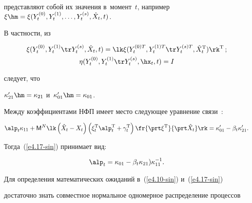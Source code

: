 представляют собой их значения в~момент~$t$, например  $\xi \hm=


\xi(Y_t^{(0)}, Y_t^{(1)}, \ldots, Y_t^{(s)}, \hat X_t,t)$.





В частности, из  


\begin{gather*}


\xi(Y_t^{(0)}, Y_t^{(1)}\tr Y_t^{(s)},\hat X_t,t)


=\lk \xi(Y_t^{(0)T}, Y_t^{(1)T}\tr Y_t^{(s)T},\hat X_t^{\mathrm{T}}) 


\rk^{\mathrm{T}}\,;\\


\eta (Y_t^{(0)}, Y_t^{(1)}\tr Y_t^{(s)},\hx_t,t) =I


\end{gather*}


следует, что


$\kappa_{21}'\hm=\kappa_{21}$ и~$\kappa_{01}'\hm=\kappa_{01}$.








Между коэффициентами НФП имеет место следующее уравнение связи~\cite{2-sin}:


 \begin{equation*}


 \alp_t \kappa_{11} + {\sf M}^N \lk \left(\hat X_t - X_t\right)


 \left(\xi_t^{\mathrm{T}} \alp_t^{\mathrm{T}} + \gamma_t^{\mathrm{T}}\right) 


 \fr{\prt \xi^{\mathrm{T}}}{\prt \hat X_t} \rk 


 = \kappa_{01}' - \beta_t \kappa_{21}'. %


 \end{equation*}


Тогда~(\ref{e4.17-sin}) принимает вид:


\begin{equation*}


\alp_t =\kappa_{01} -\beta_t \kappa_{21}) \kappa_{11}^{-1}.




\end{equation*}


Для определения математических ожиданий в~(\ref{e4.10-sin}) и~(\ref{e4.17-sin})


достаточно знать совместное нормальное одномерное распределение процессов


